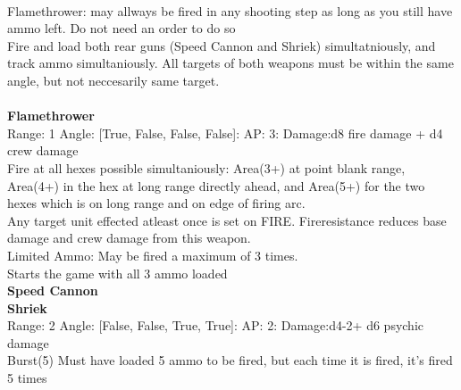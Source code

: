 \ \\
Flamethrower: may allways be fired in any shooting step as long as you still have ammo left. Do not need an order to do so\\ 
Fire and load both rear guns (Speed Cannon and Shriek) simultatniously, and track ammo simultaniously. All targets of both weapons must be within the same angle, but not neccesarily same target.\\ 

\ \\
{\bf Flamethrower } \\



Range: 1  Angle: [True, False, False, False]: AP: 3: Damage:d8 fire damage + d4 crew damage \\
Fire at all hexes possible simultaniously: Area(3+) at point blank range, Area(4+) in the hex at long range directly ahead, and Area(5+) for the two hexes which is on long range and on edge of firing arc. \\ 
 Any target unit effected atleast once is set on FIRE. Fireresistance reduces base damage and crew damage from this weapon. \\ 
 Limited Ammo: May be fired a maximum of 3 times. \\ 
 Starts the game with all 3 ammo loaded\\ 




{\bf Speed Cannon } \\






{\bf Shriek } \\



Range: 2  Angle: [False, False, True, True]: AP: 2: Damage:d4-2+ d6 psychic damage \\
Burst(5) Must have loaded 5 ammo to be fired, but each time it is fired, it's fired 5 times\\ 




 
\ \\




